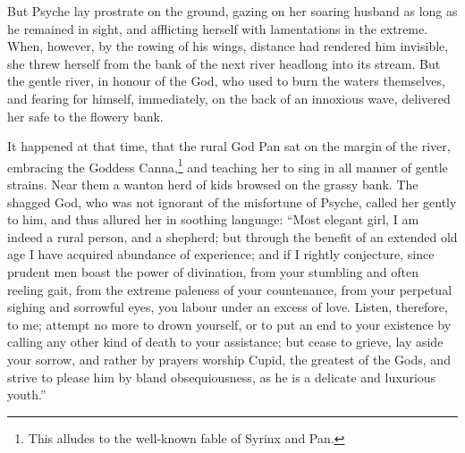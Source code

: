 \documentclass{article}
\begin{document}
But Psyche lay prostrate on the ground, gazing on her soaring husband as long
as he remained in sight, and afflicting herself with lamentations in the
extreme. When, however, by the rowing of his wings, distance had rendered him
invisible, she threw herself from the bank of the next river headlong into its
stream. But the gentle river, in honour of the God, who used to burn the waters
themselves, and fearing for himself, immediately, on the back of an innoxious
wave, delivered her safe to the flowery bank.

It happened at that time, that the rural God Pan sat on the margin of the
river, embracing the Goddess Canna,\footnote{This alludes to the well-known
fable of Syrinx and Pan.} and teaching her to sing in all manner of gentle
strains. Near them a wanton herd of kids browsed on the grassy bank. The
shagged God, who was not ignorant of the misfortune of Psyche, called her
gently to him, and thus allured her in soothing language: ``Most elegant girl,
I am indeed a rural person, and a shepherd; but through the benefit of an
extended old age I have acquired abundance of experience; and if I rightly
conjecture, since prudent men boast the power of divination, from your
stumbling and often reeling gait, from the extreme paleness of your
countenance, from your perpetual sighing and sorrowful eyes, you labour under
an excess of love. Listen, therefore, to me; attempt no more to drown yourself,
or to put an end to your existence by calling any other kind of death to your
assistance; but cease to grieve, lay aside your sorrow, and rather by prayers
worship Cupid, the greatest of the Gods, and strive to please him by bland
obsequiousness, as he is a delicate and luxurious youth.''
\end{document}
